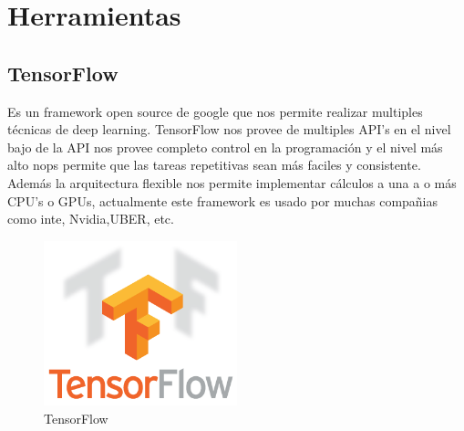 \section{Herramientas}
\subsection{TensorFlow}
Es un framework open source de google que nos permite realizar multiples técnicas de deep learning. TensorFlow nos provee de multiples API's en el nivel bajo de la API nos provee completo control en la programación y el nivel más alto nops permite que las tareas repetitivas sean más faciles y consistente.
Además la arquitectura flexible nos permite implementar cálculos a una a o más CPU's o GPUs, actualmente este framework es usado por muchas compañias como inte, Nvidia,UBER, etc.
	\begin{figure}[H]
		\centering
		\includegraphics[width=0.5\textwidth]{Figures/tensorflow}
		\caption{TensorFlow}
		\label{TensorFlow}
	\end{figure}




\afterpage{\blankpage}